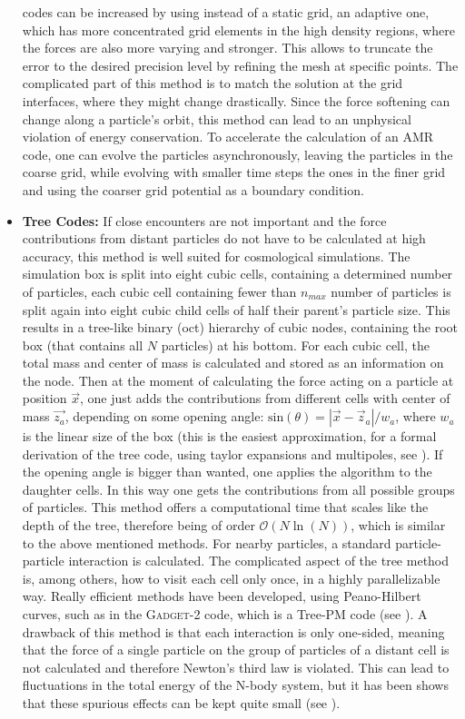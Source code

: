 \begin{itemize}
codes can be increased by using instead of a static grid, an adaptive
one, which has more concentrated grid elements in the high density
regions, where the forces are also more varying and stronger. This
allows to truncate the error to the desired precision level by refining
the mesh at specific points. The complicated part of this method is
to match the solution at the grid interfaces, where they might change
drastically. Since the force softening can change along a particle's
orbit, this method can lead to an unphysical violation of energy conservation.
To accelerate the calculation of an AMR code, one can evolve the particles
asynchronously, leaving the particles in the coarse grid, while evolving
with smaller time steps the ones in the finer grid and using the coarser
grid potential as a boundary condition.
\item \textbf{Tree Codes: }If close encounters are not important and the
force contributions from distant particles do not have to be calculated
at high accuracy, this method is well suited for cosmological simulations.
The simulation box is split into eight cubic cells, containing a determined
number of particles, each cubic cell containing fewer than $n_{max}$
number of particles is split again into eight cubic child cells of
half their parent's particle size. This results in a tree-like binary
(oct) hierarchy of cubic nodes, containing the root box (that contains
all $N$ particles) at his bottom. For each cubic cell, the total
mass and center of mass is calculated and stored as an information
on the node. Then at the moment of calculating the force acting on
a particle at position $\vec{x}$, one just adds the contributions
from different cells with center of mass $\vec{z_{a}}$, depending
on some opening angle: $\mbox{sin}(\theta)=\left|\vec{x}-\vec{z}_{a}\right|/w_{a}$,
where $w_{a}$ is the linear size of the box (this is the easiest
approximation, for a formal derivation of the tree code, using taylor
expansions and multipoles, see \cite{dehnen_n-body_2011, springel_gadget:_2001-2}). If the
opening angle is bigger than wanted, one applies the algorithm to
the daughter cells. In this way one gets the contributions from all
possible groups of particles. This method offers a computational time
that scales like the depth of the tree, therefore being of order 
$\mathcal{O}(N\ln(N))$,
which is similar to the above mentioned methods. For nearby particles,
a standard particle-particle interaction is calculated. The complicated
aspect of the tree method is, among others, how to visit each cell
only once, in a highly parallelizable way. Really efficient methods
have been developed, using Peano-Hilbert curves, such as in the \textsc{Gadget-2}
code, which is a Tree-PM code (see \cite{springel_cosmological_2005}).
A drawback of this method is that each interaction is only one-sided,
meaning that the force of a single particle on the group of particles
of a distant cell is not calculated and therefore Newton's third law
is violated. This can lead to fluctuations in the total energy of
the N-body system, but it has been shows that these spurious effects
can be kept quite small (see \cite{dehnen_n-body_2011}). 


\end{itemize}
